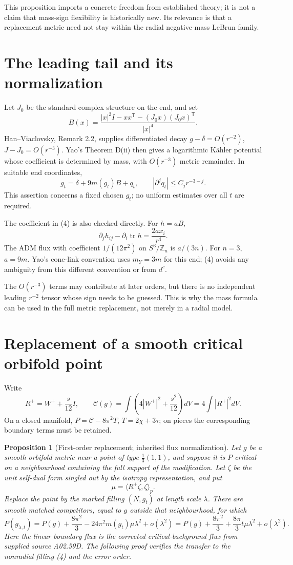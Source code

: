 \documentclass[11pt]{article}
\newtheorem{proposition}[theorem]{Proposition}
\newcommand{\calC}{\mathcal C}
\begin{document}
This proposition imports a concrete freedom from established theory;
it is not a claim that mass-sign flexibility is historically new.
Its relevance is that a replacement metric need not stay within the
radial negative-mass LeBrun family.

\section{The leading tail and its normalization}
Let $J_0$ be the standard complex structure on the end, and set
\[
 B(x)=\frac{|x|^2 I-xx^{\mathsf T}-(J_0x)(J_0x)^{\mathsf T}}{|x|^4}.
 \tag{3}
\]
Han--Viaclovsky, Remark 2.2, supplies differentiated decay
$g-\delta=O(r^{-2})$, $J-J_0=O(r^{-3})$.
Yao's Theorem D(ii) \cite{Yao} then gives a logarithmic K\"ahler
potential whose coefficient is determined by mass, with
$O(r^{-3})$ metric remainder. In suitable end coordinates,
\[
 g_t=\delta+9m(g_t)B+q_t,\qquad
 |\partial^j q_t|\le C_jr^{-3-j}.
 \tag{4}
\]
This assertion concerns a fixed chosen $g_t$; no uniform estimates
over all $t$ are required.

The coefficient in (4) is also checked directly. For $h=aB$,
\[
 \partial_jh_{ij}-\partial_i\operatorname{tr}h
       =\frac{2ax_i}{r^4}.
\]
The ADM flux with coefficient $1/(12\pi^2)$ on
$S^3/\mathbb Z_n$ is $a/(3n)$. For $n=3$, $a=9m$.
Yao's cone-link convention uses $m_Y=3m$ for this end; (4) avoids
any ambiguity from this different convention or from $d^c$.

The $O(r^{-3})$ terms may contribute at later orders, but there is
no independent leading $r^{-2}$ tensor whose sign needs to be
guessed. This is why the mass formula can be used in the full
metric replacement, not merely in a radial model.

\section{Replacement of a smooth critical orbifold point}
Write
\[
 R^+=W^++\frac{s}{12}I,\qquad
 \calC(g)=\int\left(4|W^+|^2+\frac{s^2}{12}\right)dV
          =4\int|R^+|^2dV.
\]
On a closed manifold, $P=\calC-8\pi^2T$, $T=2\chi+3\tau$;
on pieces the corresponding boundary terms must be retained.

\begin{proposition}[First-order replacement; inherited flux normalization]
Let $g$ be a smooth orbifold metric near a point of type
$\frac13(1,1)$, and suppose it is $P$-critical on a neighbourhood
containing the full support of the modification. Let $\zeta$ be the
unit self-dual form singled out by the isotropy representation, and put
\[
 \mu=\langle R^+\zeta,\zeta\rangle_p.
\]
Replace the point by the marked filling $(N,g_t)$ at length scale
$\lambda$. There are smooth matched competitors, equal to $g$
outside that neighbourhood, for which
\[
 P(g_{\lambda,t})=P(g)+\frac{8\pi^2}{3}
       -24\pi^2m(g_t)\mu\lambda^2+o(\lambda^2)
 =P(g)+\frac{8\pi^2}{3}
       +\frac{8\pi}{3}t\mu\lambda^2+o(\lambda^2).
 \tag{5}
\]
Here the linear boundary flux is the corrected critical-background
flux from supplied source A02.59D. The following proof verifies the
transfer to the nonradial filling (4) and the error order.
\end{proposition}
\end{document}
